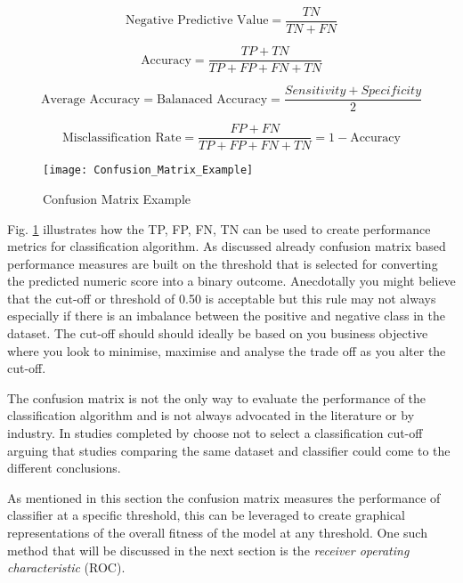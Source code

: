 \begin{equation} \label{eq:npv}
\text{Negative Predictive Value} = \frac{TN}{TN + FN}
\end{equation}

\begin{equation} \label{eq:Accuracy}
\text{Accuracy} = \frac{TP + TN}{TP + FP + FN + TN}
\end{equation}

\begin{equation} \label{eq:Balanaced Accuracy}
\text{Average Accuracy} = \text{Balanaced Accuracy} = \frac{Sensitivity + Specificity}{2}
\end{equation}

\begin{equation} \label{eq:Misclassification Rate}
\text{Misclassification Rate} =  \frac{FP + FN}{TP + FP + FN + TN} = 1 - \text{Accuracy}
\end{equation}

\begin{figure}[H]
	\texttt{[image: Confusion\_Matrix\_Example]}
	\caption[Confusion Matrix Example]
	{Confusion Matrix Example}
	\label{fig:ConfusionMatrixExample}
\end{figure}

Fig. \ref{fig:ConfusionMatrixExample} illustrates how the TP, FP, FN, TN can be used to create performance metrics for classification algorithm. As discussed already confusion matrix based performance measures are built on the threshold that is selected for converting the predicted numeric score into a binary outcome. Anecdotally you might believe that the cut-off or threshold of 0.50 is acceptable but this rule may not always especially if there is an imbalance between the positive and negative class in the dataset. The cut-off should should ideally be based on you business objective where you look to minimise, maximise and analyse the trade off as you alter the cut-off. 

The confusion matrix is not the only way to evaluate the performance of the classification algorithm and is not always advocated in the literature or by industry. In studies completed by \citep{lessmann_benchmarking_2008} choose not to select a classification cut-off arguing that studies comparing the same dataset and classifier could come to the different conclusions.

As mentioned in this section the confusion matrix measures the performance of classifier at a specific threshold, this can be leveraged to create graphical representations of the overall fitness of the model at any threshold. One such method that will be discussed in the next section is the \textit{receiver operating characteristic} (ROC). 


